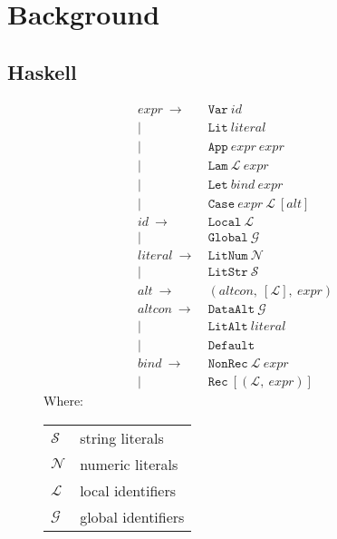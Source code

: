 \section{Background}
\label{background}

\subsection{Haskell}
\label{haskell}

\begin{figure}
  \begin{equation*}
    \begin{split}
      expr\    \rightarrow\ & \texttt{Var}\ id                                       \\
                         |\ & \texttt{Lit}\ literal                                  \\
                         |\ & \texttt{App}\ expr\ expr                               \\
                         |\ & \texttt{Lam}\ \mathcal{L}\ expr                        \\
                         |\ & \texttt{Let}\ bind\ expr                               \\
                         |\ & \texttt{Case}\ expr\ \mathcal{L}\ \left[ alt \right]   \\
      id\      \rightarrow\ & \texttt{Local}\ \mathcal{L}                            \\
                         |\ & \texttt{Global}\ \mathcal{G}                           \\
      literal\ \rightarrow\ & \texttt{LitNum}\ \mathcal{N}                           \\
                         |\ & \texttt{LitStr}\ \mathcal{S}                           \\
      alt\     \rightarrow\ & ( altcon,\ [\mathcal{L}],\ expr )                      \\
      altcon\  \rightarrow\ & \texttt{DataAlt}\ \mathcal{G}                          \\
                         |\ & \texttt{LitAlt}\ literal                               \\
                         |\ & \texttt{Default}                                       \\
      bind\    \rightarrow\ & \texttt{NonRec}\ \mathcal{L}\ expr                     \\
                         |\ & \texttt{Rec}\ [ ( \mathcal{L},\ expr ) ]
    \end{split}
  \end{equation*}
  Where:
  \begin{tabular}[t]{l @{ $=$ } l}
    $\mathcal{S}$ & string literals    \\
    $\mathcal{N}$ & numeric literals   \\
    $\mathcal{L}$ & local identifiers  \\
    $\mathcal{G}$ & global identifiers
  \end{tabular}


\end{figure}
